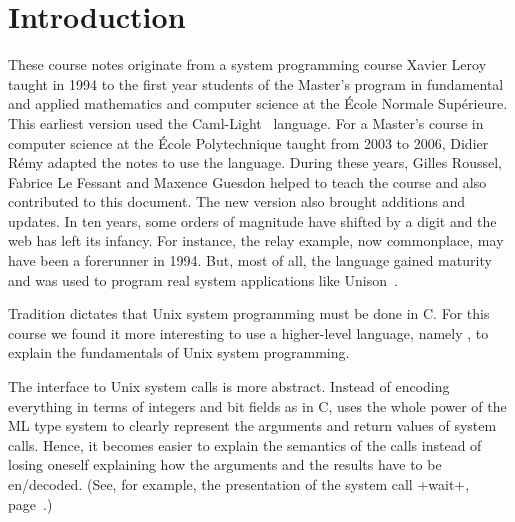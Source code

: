 %
%

\chapter*{\label{sec/intro}Introduction}
\enlargethispage{2\baselineskip} %

These course notes originate from a system programming course Xavier
Leroy taught in 1994 to the first year students of the Master's program in
fundamental and applied mathematics and computer science at the École
Normale Supérieure. This earliest version used the
Caml-Light~\cite{Caml-Light} language.
%
For a Master's course in computer science at the École Polytechnique
taught from 2003 to 2006, Didier Rémy adapted the notes to use the
{\ocaml} language. During these years, Gilles Roussel, Fabrice Le
Fessant and Maxence Guesdon helped to teach the course and also
contributed to this document. The new version also brought
additions and updates. In ten years, some orders of magnitude have
shifted by a digit and the web has left its infancy. For instance, the
{\http} relay example, now commonplace, may have been a forerunner in
1994. But, most of all, the {\ocaml} language gained maturity and was
used to program real system applications like Unison~\cite{Unison}.

Tradition dictates that Unix system programming must be done in C. For
this course we found it more interesting to use a higher-level
language, namely {\ocaml}, to explain the fundamentals of Unix system
programming.

The {\ocaml} interface to Unix system calls is more abstract. Instead
of encoding everything in terms of integers and bit fields as in C,
{\ocaml} uses the whole power of the ML type system to clearly
represent the arguments and return values of system calls. Hence, it
becomes easier to explain the semantics of the calls instead of losing
oneself explaining how the arguments and the results have to be
en/decoded. (See, for example, the presentation of the system call
\ml+wait+, page~\pageref{wait}.)

